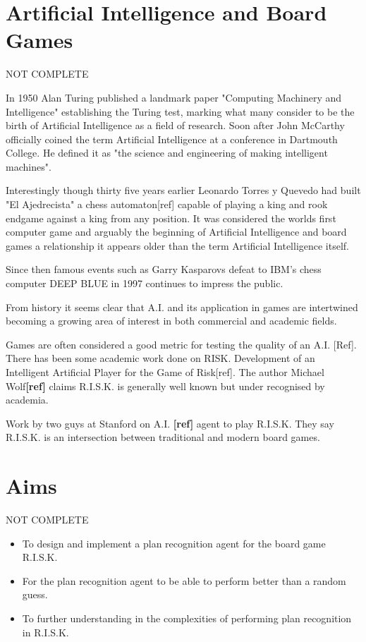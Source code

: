 \documentclass[parskip]{cs4rep}
\begin{document}
\section{Artificial Intelligence and Board Games}

NOT COMPLETE

In 1950 Alan Turing published a landmark paper "Computing Machinery and Intelligence" establishing the Turing test, marking what many consider to be the birth of Artificial Intelligence as a field of research. Soon after John McCarthy officially coined the term Artificial Intelligence at a conference in Dartmouth College. He defined it as "the science and engineering of making intelligent machines".

Interestingly though thirty five years earlier Leonardo Torres y Quevedo had built "El Ajedrecista" a chess automaton[ref] capable of playing a king and rook endgame against a king from any position. It was considered the worlds first computer game and arguably the beginning of Artificial Intelligence and board games a relationship it appears older than the term Artificial Intelligence itself. 

Since then famous events such as Garry Kasparovs defeat to IBM's chess computer DEEP BLUE in 1997 continues to impress the public. 

From history it seems clear that A.I. and its application in games are intertwined becoming a growing area of interest in both commercial and academic fields.

Games are often considered a good metric for testing the quality of an A.I. [Ref]. There has been some academic work done on RISK. Development of an Intelligent Artificial Player for the Game of Risk[ref]. The author Michael Wolf\textbf{[ref]} claims R.I.S.K. is generally well known but under recognised by academia.

Work by two guys at Stanford on A.I. \textbf{[ref]} agent to play R.I.S.K. They say R.I.S.K. is an intersection between traditional and modern board games.

\section{Aims}

NOT COMPLETE

\begin{itemize}
\item
To design and implement a plan recognition agent for the board game R.I.S.K.
\item
For the plan recognition agent to be able to perform better than a random guess.
\item
To further understanding in the complexities of performing plan recognition in R.I.S.K.
\end{itemize}
\end{document}
